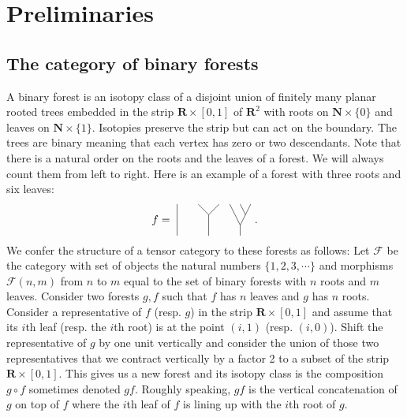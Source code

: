 \documentclass[a4paper,12pt]{amsart}
\numberwithin{equation}{section}
\theoremstyle{definition}
\newcommand{\cF}{\mathcal F}
\newcommand{\N}{\mathbf{N}}
\newcommand{\ot}{\otimes}\newcommand{\otmin}{\otimes_{\text{min}}}
\newcommand{\R}{\mathbf{R}}
\begin{document}
\section{Preliminaries}\label{sec:prelim}

\subsection{The category of binary forests} 

A binary forest is an isotopy class of a disjoint union of finitely many planar rooted trees embedded in the strip $\R\times [0,1]$ of $\R^2$ with roots on $\N\times \{0\}$ and leaves on $\N\times \{1\}.$
Isotopies preserve the strip but can act on the boundary.
The trees are binary meaning that each vertex has zero or two descendants.
Note that there is a natural order on the roots and the leaves of a forest.
We will always count them from left to right.
%
\newcommand{\forest}{
\begin{tikzpicture}[baseline = .4cm]
\draw (0,0)--(0,1);
\draw (1,0)--(1,2/3);
\draw (1,2/3)--(2/3,1);
\draw (1,2/3)--(4/3,1);
\draw (2,0)--(2,1/3);
\draw (2,1/3)--(5/3,1);
\draw (2,1/3)--(7/3,1);
\draw (13/6,2/3)--(2,1);
\end{tikzpicture}
}
%
{Here is an example of a forest with three roots and six leaves:
$$f = \ \forest \ .$$
}
We confer the structure of a tensor category to these forests as follows:
 Let $\cF$ be the category with set of objects the natural numbers $\{1,2,3,\cdots\}$ and morphisms $\cF(n,m)$ from $n$ to $m$ equal to the set of binary forests with $n$ roots and $m$ leaves.
Consider two forests $g,f$ such that $f$ has $n$ leaves and $g$ has $n$ roots. 
Consider a representative of $f$ (resp. $g$) in the strip $\R \times [0,1]$ and assume that its $i$th leaf (resp. the $i$th root) is at the point $(i,1)$ (resp. $(i,0)$).
Shift the representative of $g$ by one unit vertically and consider the union of those two representatives that we contract vertically by a factor 2 to a subset of the strip $\R\times [0,1]$.
This gives us a new forest and its isotopy class is the composition $g\circ f$ sometimes denoted $gf$.
Roughly speaking, $gf$ is the vertical concatenation of $g$ on top of $f$ where the $i$th leaf of $f$ is lining up with the $i$th root of $g$. 
\newcommand{\funfun}{
\begin{tikzpicture}[baseline=.2cm, scale = .4]
\draw (0,0)--(0,-.5);
\draw (0,0)--(-1,2);
\draw (-.5,1)--(0,2);
\draw (0,0)--(1,2);
\end{tikzpicture}
}
\end{document}
